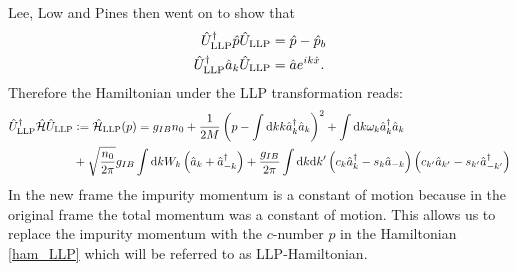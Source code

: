 Lee, Low and Pines \cite[eq. (8)]{LLP} then went on to show that
\begin{subequations}
\begin{align}
\hat U_{\mathrm{LLP}}^\dagger \hat p \hat U_{\mathrm{LLP}} &= \hat p -\hat p_b\\
\hat U_{\mathrm{LLP}}^\dagger \hat a_k \hat U_{\mathrm{LLP}} &= \hat a e^{i k\hat x}.
\end{align}
\end{subequations}
Therefore the Hamiltonian under the LLP transformation reads:
\begin{align}\label{ham_LLP}
\hat U_{\mathrm{LLP}}^\dagger\hat{\mathcal{H}}\hat U_{\mathrm{LLP}} &\vcentcolon= \hat{\mathcal{H}}_{\mathrm{LLP}}(p) =g_{IB}n_0+\frac{1}{2M}\left(p-\int\mathrm d k k \hat a^\dagger_k\hat a_k \right)^2+\int\mathrm d k\omega_{ k}\hat a^\dagger_{ k}\hat a_{ k}\\
&+\sqrt{\frac{n_0}{2\pi}}g_{IB}\int \mathrm d k W_k \left(\hat a_{ k}+\hat a^\dagger_{- k}\right) + \frac{g_{IB}}{2\pi}\int\mathrm d k\mathrm d k^\prime \left(c_k\hat a^\dagger_k-s_k\hat a_{-k}\right)\left(c_{k^\prime}\hat a_{k^\prime}-s_{k^\prime}\hat a^\dagger_{-k^\prime}\right)\nonumber
\end{align}
In the new frame the impurity momentum is a constant of motion because in the original frame the total momentum was a constant of motion. This allows us to replace the impurity momentum with the $c$-number $p$ in the Hamiltonian \ref{ham_LLP} which will be referred to as LLP-Hamiltonian.


